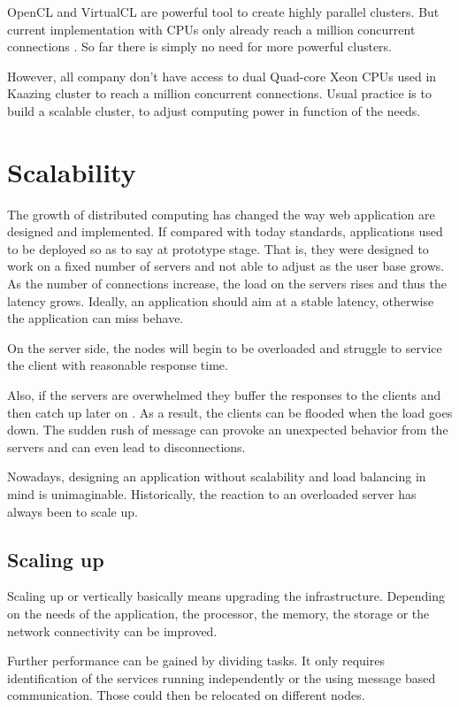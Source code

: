 OpenCL and VirtualCL are powerful tool to create highly parallel clusters.  But
current implementation with CPUs only already reach a million concurrent
connections \citep{Reference13}. So far there is simply no need for more
powerful clusters.

However, all company don't have access to dual Quad-core Xeon CPUs used in
Kaazing cluster to reach a million concurrent connections. Usual practice is to
build a scalable cluster, to adjust computing power in function of the needs.

\section{Scalability}

The growth of distributed computing has changed the way web application are
designed and implemented. If compared with today standards, applications used
to be deployed so as to say at prototype stage. That is, they were designed to
work on a fixed number of servers and not able to adjust as the user base grows.
As the number of connections increase, the load on the servers rises and thus
the latency grows. Ideally, an application should aim at a stable latency,
otherwise the application can miss behave.

On the server side, the nodes will begin to be overloaded and struggle to
service the client with reasonable response time.

Also, if the servers are overwhelmed they buffer the responses to the clients
and then catch up later on . As a result, the clients can be flooded when the
load goes down. The sudden rush of message can provoke an unexpected behavior
from the servers and can even lead to disconnections.

Nowadays, designing an application without scalability and load balancing in
mind is unimaginable. Historically, the reaction to an overloaded server
has always been to scale up.

\subsection{Scaling up}

Scaling up or vertically basically means upgrading the infrastructure.
Depending on the needs of the application, the processor, the memory, the
storage or the network connectivity can be improved.

Further performance can be gained by dividing tasks. It only requires
identification of the services  running independently or the using message
based communication. Those could then be relocated on different nodes.

